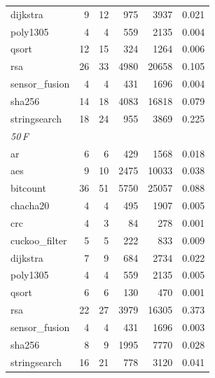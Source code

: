 \begin{tabular}{lrrrrr}
dijkstra       & \num{9} & \num{12} & \num{975} & \num{3937} & \num{0.021} \\
poly1305       & \num{4} & \num{4} & \num{559} & \num{2135} & \num{0.004} \\
qsort          & \num{12} & \num{15} & \num{324} & \num{1264} & \num{0.006} \\
rsa            & \num{26} & \num{33} & \num{4980} & \num{20658} & \num{0.105} \\
sensor\_fusion & \num{4} & \num{4} & \num{431} & \num{1696} & \num{0.004} \\
sha256         & \num{14} & \num{18} & \num{4083} & \num{16818} & \num{0.079} \\
stringsearch   & \num{18} & \num{24} & \num{955} & \num{3869} & \num{0.225} \\
\midrule
\multicolumn{1}{l}{\textit{50\,\textmu{}F}} \\
ar             & \num{6} & \num{6} & \num{429} & \num{1568} & \num{0.018} \\
aes            & \num{9} & \num{10} & \num{2475} & \num{10033} & \num{0.038} \\
bitcount       & \num{36} & \num{51} & \num{5750} & \num{25057} & \num{0.088} \\
chacha20       & \num{4} & \num{4} & \num{495} & \num{1907} & \num{0.005} \\
crc            & \num{4} & \num{3} & \num{84} & \num{278} & \num{0.001} \\
cuckoo\_filter & \num{5} & \num{5} & \num{222} & \num{833} & \num{0.009} \\
dijkstra       & \num{7} & \num{9} & \num{684} & \num{2734} & \num{0.022} \\
poly1305       & \num{4} & \num{4} & \num{559} & \num{2135} & \num{0.005} \\
qsort          & \num{6} & \num{6} & \num{130} & \num{470} & \num{0.001} \\
rsa            & \num{22} & \num{27} & \num{3979} & \num{16305} & \num{0.373} \\
sensor\_fusion & \num{4} & \num{4} & \num{431} & \num{1696} & \num{0.003} \\
sha256         & \num{8} & \num{9} & \num{1995} & \num{7770} & \num{0.028} \\
stringsearch   & \num{16} & \num{21} & \num{778} & \num{3120} & \num{0.041} \\
\bottomrule
\end{tabular}

